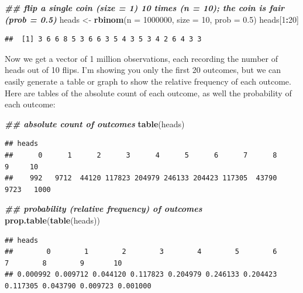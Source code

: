 \documentclass[
]{book}
\newenvironment{Shaded}{\begin{snugshade}}{\end{snugshade}}
\newcommand{\AttributeTok}[1]{\textcolor[rgb]{0.13,0.29,0.53}{#1}}
\newcommand{\DecValTok}[1]{\textcolor[rgb]{0.00,0.00,0.81}{#1}}
\newcommand{\DocumentationTok}[1]{\textcolor[rgb]{0.56,0.35,0.01}{\textbf{\textit{#1}}}}
\newcommand{\FloatTok}[1]{\textcolor[rgb]{0.00,0.00,0.81}{#1}}
\newcommand{\FunctionTok}[1]{\textcolor[rgb]{0.13,0.29,0.53}{\textbf{#1}}}
\newcommand{\NormalTok}[1]{#1}
\newcommand{\OtherTok}[1]{\textcolor[rgb]{0.56,0.35,0.01}{#1}}
\newcommand{\SpecialCharTok}[1]{\textcolor[rgb]{0.81,0.36,0.00}{\textbf{#1}}}
\begin{document}
\begin{Shaded}
\begin{Highlighting}[]
\DocumentationTok{\#\# flip a single coin (size = 1) 10 times (n = 10); the coin is fair (prob = 0.5)}
\NormalTok{heads }\OtherTok{\textless{}{-}} \FunctionTok{rbinom}\NormalTok{(}\AttributeTok{n =} \DecValTok{1000000}\NormalTok{, }\AttributeTok{size =} \DecValTok{10}\NormalTok{, }\AttributeTok{prob =} \FloatTok{0.5}\NormalTok{)}
\NormalTok{heads[}\DecValTok{1}\SpecialCharTok{:}\DecValTok{20}\NormalTok{]}
\end{Highlighting}
\end{Shaded}

\begin{verbatim}
##  [1] 3 6 6 8 5 3 6 6 3 5 4 3 5 3 4 2 6 4 3 3
\end{verbatim}

Now we get a vector of 1 million observations, each recording the number of heads out of 10 flips. I'm showing you only the first 20 outcomes, but we can easily generate a table or graph to show the relative frequency of each outcome. Here are tables of the absolute count of each outcome, as well the probability of each outcome:

\begin{Shaded}
\begin{Highlighting}[]
\DocumentationTok{\#\# absolute count of outcomes}
\FunctionTok{table}\NormalTok{(heads)}
\end{Highlighting}
\end{Shaded}

\begin{verbatim}
## heads
##      0      1      2      3      4      5      6      7      8      9     10 
##    992   9712  44120 117823 204979 246133 204423 117305  43790   9723   1000
\end{verbatim}

\begin{Shaded}
\begin{Highlighting}[]
\DocumentationTok{\#\# probability (relative frequency) of outcomes}
\FunctionTok{prop.table}\NormalTok{(}\FunctionTok{table}\NormalTok{(heads))}
\end{Highlighting}
\end{Shaded}

\begin{verbatim}
## heads
##        0        1        2        3        4        5        6        7        8        9       10 
## 0.000992 0.009712 0.044120 0.117823 0.204979 0.246133 0.204423 0.117305 0.043790 0.009723 0.001000
\end{verbatim}
\end{document}
